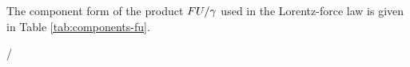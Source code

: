 \noindent The component form of the product \(F U/\gamma\) used in the Lorentz-force law is given in Table \ref{tab:components-fu}.
\begin{componenttable}{ /\gamma}
\end{componenttable}
